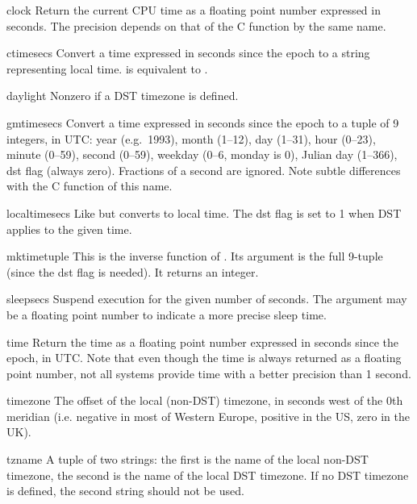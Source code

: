 \begin{funcdesc}{clock}{}
Return the current CPU time as a floating point number expressed in
seconds.  The precision depends on that of the C function by the same
name.
\end{funcdesc}


\begin{funcdesc}{ctime}{secs}
Convert a time expressed in seconds since the epoch to a string
representing local time.   is equivalent to
.
\end{funcdesc}

\begin{datadesc}{daylight}
Nonzero if a DST timezone is defined.
\end{datadesc}

\begin{funcdesc}{gmtime}{secs}
Convert a time expressed in seconds since the epoch to a tuple of 9
integers, in UTC: year (e.g.\ 1993), month (1--12), day (1--31), hour
(0--23), minute (0--59), second (0--59), weekday (0--6, monday is 0),
Julian day (1--366), dst flag (always zero).  Fractions of a second are
ignored.  Note subtle differences with the C function of this name.
\end{funcdesc}

\begin{funcdesc}{localtime}{secs}
Like  but converts to local time.  The dst flag is set
to 1 when DST applies to the given time.
\end{funcdesc}

\begin{funcdesc}{mktime}{tuple}
This is the inverse function of .  Its argument is the
full 9-tuple (since the dst flag is needed).  It returns an integer.
\end{funcdesc}

\begin{funcdesc}{sleep}{secs}
Suspend execution for the given number of seconds.  The argument may
be a floating point number to indicate a more precise sleep time.
\end{funcdesc}

\begin{funcdesc}{time}{}
Return the time as a floating point number expressed in seconds since
the epoch, in UTC.  Note that even though the time is always returned
as a floating point number, not all systems provide time with a better
precision than 1 second.
\end{funcdesc}

\begin{datadesc}{timezone}
The offset of the local (non-DST) timezone, in seconds west of the 0th
meridian (i.e. negative in most of Western Europe, positive in the US,
zero in the UK).
\end{datadesc}

\begin{datadesc}{tzname}
A tuple of two strings: the first is the name of the local non-DST
timezone, the second is the name of the local DST timezone.  If no DST
timezone is defined, the second string should not be used.
\end{datadesc}
